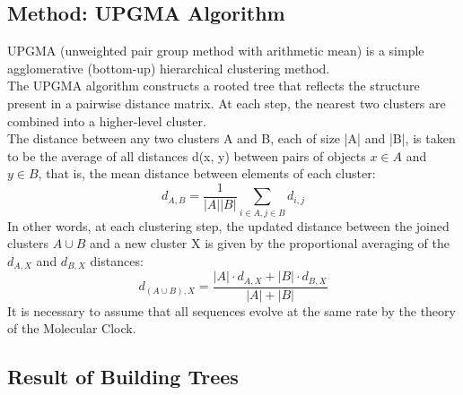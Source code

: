 \documentclass[a4paper, 12pt, one column]{article}
\begin{document}
\subsection{Method: UPGMA Algorithm}
UPGMA (unweighted pair group method with arithmetic mean) is a simple agglomerative (bottom-up) hierarchical clustering method. \\
The UPGMA algorithm constructs a rooted tree that reflects the structure present in a pairwise distance matrix. At each step, 
the nearest two clusters are combined into a higher-level cluster.  \\
The distance between any two clusters A and B, each of size |A| and |B|, 
is taken to be the average of all distances d(x, y) between pairs of objects $x \in A$ and $y \in B$, 
that is, the mean distance between elements of each cluster:\\
\begin{equation}
    d_{A,B}= \dfrac{1}{|A||B|} \sum_{i \in A, j\in B} {d_{i,j}}
\end{equation}
In other words, at each clustering step, the updated distance between the joined clusters $ A \cup B $ and a new cluster X is given by the proportional averaging of the $d_{A,X}$ and $d_{B,X}$ distances: \\
\begin{equation}
    d_{(A\cup B), X}= \dfrac{|A|\cdot d_{A,X}+ |B|\cdot d_{B,X} }{|A|+|B|}
\end{equation}
It is necessary to assume that all sequences evolve at the same rate by the theory of the Molecular Clock.

\subsection{Result of Building Trees}
\end{document}
